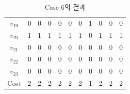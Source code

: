 \documentclass{article}
\begin{document}
\begin{table}[htb!]
\begin{minipage}{0.475\linewidth}
\begin{tabular}{c | c c c c c c c c c c}
        $v_{19}$ & 0 & 0 & 0 & 0 & 0 & 0 & 1 & 0 & 0 & 0 \\
        $v_{20}$ & 1 & 1 & 1 & 1 & 1 & 1 & 0 & 1 & 1 & 1 \\
        $v_{21}$ & 0 & 0 & 0 & 0 & 0 & 0 & 0 & 0 & 0 & 0 \\
        $v_{22}$ & 0 & 0 & 0 & 0 & 0 & 0 & 0 & 0 & 0 & 0 \\
        $v_{23}$ & 0 & 0 & 0 & 0 & 0 & 0 & 0 & 0 & 0 & 0 \\
        \hline
        Cost & 2 & 2 & 2 & 2 & 2 & 2 & 1 & 2 & 2 & 2 \\
        \hline
    \end{tabular}
    \caption{Case 6의 결과}
    \label{tab:result6}
    \end{minipage}
    \end{table}
\end{document}
